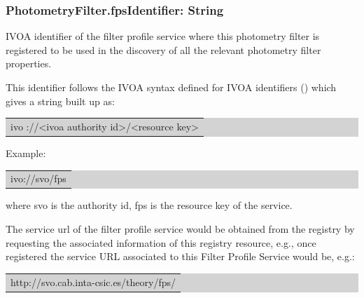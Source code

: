 \documentclass[11pt,a4paper]{ivoa}
\begin{document}

\subsubsection{PhotometryFilter.fpsIdentifier: String}
IVOA identifier of the filter profile service where this photometry filter is registered to be used in the discovery of all the relevant photometry filter properties.
\par

This identifier follows the IVOA syntax defined for IVOA identifiers (\cite{plante}) which gives a string built up as:
\par

\bigskip
\begingroup\setlength{\fboxsep}{0pt}
\colorbox{lightgray}{%
\begin{tabular}{|p{5.53in}|}
ivo ://<ivoa authority id>/<resource key>
\end{tabular}%
}\endgroup
\par
\bigskip




Example:
\par

\bigskip
\begingroup\setlength{\fboxsep}{0pt}
\colorbox{lightgray}{%
\begin{tabular}{|p{5.53in}|}
ivo://svo/fps
\end{tabular}%
}\endgroup
\par
\bigskip




where svo is the authority id, fps is the resource key of the service. 
\par

The service url of the filter profile service would be obtained from the registry by requesting the associated information of this registry resource, e.g., once registered the service URL associated to this Filter Profile Service would be, e.g.:
\par

\bigskip
\par
\begingroup\setlength{\fboxsep}{0pt}
\colorbox{lightgray}{%
\begin{tabular}{|p{5.53in}|}
http://svo.cab.inta-csic.es/theory/fps/
\end{tabular}%
}\endgroup
\par
\bigskip
\end{document}
